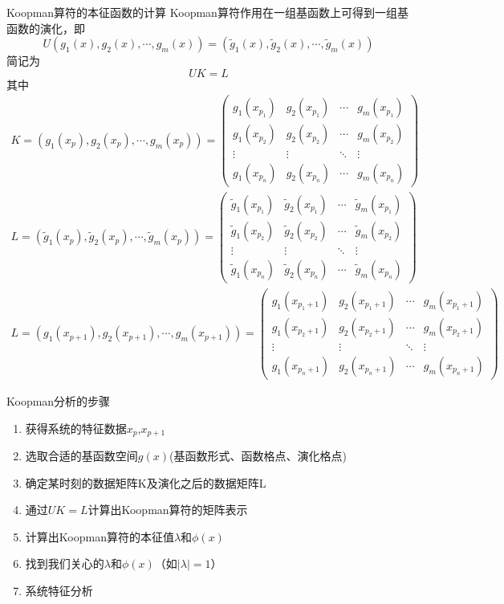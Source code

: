 \documentclass{beamer}
\begin{document}
	\begin{frame}{Koopman算符的本征函数的计算}
	Koopman算符作用在一组基函数上可得到一组基函数的演化，即
	$$U(g_1(x),g_2(x),\cdots,g_m(x))=(\tilde{g}_1(x),\tilde{g}_2(x),\cdots,\tilde{g}_m(x))$$
	简记为$$UK=L$$
	其中
	\tiny
	\begin{gather}
	K=(g_1(x_p),g_2(x_p),\cdots,g_m(x_p))=
	\begin{pmatrix}
	g_1(x_{p_1})&g_2(x_{p_1})&\cdots&g_m(x_{p_1})\\
	g_1(x_{p_2})&g_2(x_{p_2})&\cdots&g_m(x_{p_2})\\
	\vdots&\vdots&\ddots&\vdots\\
	g_1(x_{p_n})&g_2(x_{p_n})&\cdots&g_m(x_{p_n})
	\end{pmatrix}\\
	L=(\tilde{g}_1(x_p),\tilde{g}_2(x_p),\cdots,\tilde{g}_m(x_p))=
	\begin{pmatrix}
	\tilde{g}_1(x_{p_1})&\tilde{g}_2(x_{p_1})&\cdots&\tilde{g}_m(x_{p_1})\\
	\tilde{g}_1(x_{p_2})&\tilde{g}_2(x_{p_2})&\cdots&\tilde{g}_m(x_{p_2})\\
	\vdots&\vdots&\ddots&\vdots\\
	\tilde{g}_1(x_{p_n})&\tilde{g}_2(x_{p_n})&\cdots&\tilde{g}_m(x_{p_n})
	\end{pmatrix}\\
	L=(g_1(x_{p+1}),g_2(x_{p+1}),\cdots,g_m(x_{p+1}))=
	\begin{pmatrix}
	g_1(x_{p_1+1})&g_2(x_{p_1+1})&\cdots&g_m(x_{p_1+1})\\
	g_1(x_{p_2+1})&g_2(x_{p_2+1})&\cdots&g_m(x_{p_2+1})\\
	\vdots&\vdots&\ddots&\vdots\\
	g_1(x_{p_n+1})&g_2(x_{p_n+1})&\cdots&g_m(x_{p_n+1})
	\end{pmatrix}
	\end{gather}
	\end{frame}
	\begin{frame}{Koopman分析的步骤}
	\begin{enumerate}
		\item 获得系统的特征数据$x_p$,$x_{p+1}$
		\item 选取合适的基函数空间$g(x)$(基函数形式、函数格点、演化格点)
		\item 确定某时刻的数据矩阵K及演化之后的数据矩阵L
		\item 通过$UK=L$计算出Koopman算符的矩阵表示
		\item 计算出Koopman算符的本征值$\lambda$和$\phi(x)$
		\item 找到我们关心的$\lambda$和$\phi(x)$（如$|\lambda|=1$）
		\item 系统特征分析
	\end{enumerate}
	\end{frame}
\end{document}
